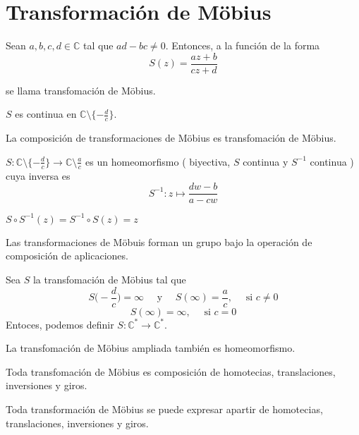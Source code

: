 \section{Transformación de Möbius}
\begin{defn}
  Sean $a, b, c, d \in \mathbb{C}$ tal que $ ad - b c \neq 0$. Entonces, a la función de la forma 
  \[ 
    S(z) = \frac{az +b}{cz + d}
  \]

  se llama transfomación de Möbius.
\end{defn}

\begin{obs}
  $S$ es continua en $\mathbb{C} \setminus \{ -\frac{d}{c} \}$.
\end{obs}

\begin{prop}
  La composición de transformaciones de Möbius es transfomación de Möbius.
\end{prop}

\begin{prop}
  $S:\mathbb{C} \setminus \{ -\frac{d}{c} \} \to \mathbb{C} \setminus \frac{a}{c}$ es un homeomorfismo ( biyectiva, $S$ continua y $S^{-1}$ continua ) cuya inversa es
  \[ 
    S^{-1}: z \mapsto \frac{dw - b}{a - cw} 
  \] 
  
\end{prop}

\begin{obs}
  $S \circ S^{-1}(z) = S^{-1} \circ S (z) = z$
\end{obs}

\begin{obs}
  Las transformaciones de Möbuis forman un grupo bajo la operación de composición de aplicaciones.
\end{obs}

\begin{defn}
  Sea $S$ la transfomación de Möbius tal que
  \[
    S \Big ( -\frac{d}{c} \Big ) = \infty  \quad \text{ y } \quad S(\infty) = \frac{a}{c}, \quad \text{ si } c \neq 0
  \]
  \[
    S(\infty) = \infty, \quad \text{ si } c = 0
  \]
  Entoces, podemos definir $S: \mathbb{C}^{*} \to \mathbb{C}^*$.
\end{defn}

\begin{obs}
  La transfomación de Möbius ampliada también es homeomorfismo.
\end{obs}

\begin{theo}
  Toda transfomación de Möbius es composición de homotecias, translaciones, inversiones y giros.
\end{theo}

\begin{obs}
  Toda transformación de Möbius se puede expresar apartir de homotecias, translaciones, inversiones y giros.
\end{obs}
